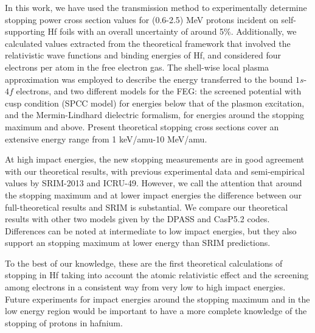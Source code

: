 \documentclass[aps,pra,reprint,superscriptaddress]{revtex4-1}
\begin{document}
In this work, we have used the transmission method to experimentally 
determine stopping power cross section values for (0.6-2.5) MeV protons 
incident on self-supporting Hf foils with an overall uncertainty of 
around 5\%. Additionally, we calculated values extracted from the 
theoretical framework that involved the relativistic wave functions and 
binding energies of Hf, and considered four electrons per atom in the free 
electron gas. The shell-wise local plasma approximation was employed to 
describe the energy transferred to the bound $1s$-$4f$ electrons, and 
two different models for the FEG: the screened potential with cusp 
condition (SPCC model) for energies below that of the plasmon 
excitation, and the Mermin-Lindhard dielectric formalism, for energies 
around the stopping maximum and above. Present theoretical stopping 
cross sections cover an extensive energy range from 1 keV/amu-10 MeV/amu.

At high impact energies, the new stopping  measurements are in good 
agreement with our theoretical results, with previous experimental data
and semi-empirical values by SRIM-2013 and ICRU-49.  However, we call 
the attention that around the stopping maximum and at lower impact 
energies the difference between our full-theoretical results and SRIM 
is substantial. We compare our theoretical results with other two 
models given by the DPASS and CasP5.2 codes. Differences can be noted 
at intermediate to low impact energies, but  they also support an 
stopping maximum at lower energy than SRIM predictions.

To the best of our knowledge, these are the first 
theoretical calculations of stopping in Hf taking into account the 
atomic relativistic effect and the screening among electrons in a 
consistent way from very low to high impact energies. Future 
experiments for impact energies around the stopping maximum and in 
the low energy region would be important to have a more complete 
knowledge of the stopping of protons in hafnium.
\end{document}
